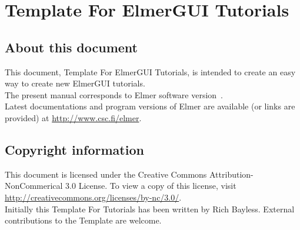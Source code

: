 \chapter*{Template For ElmerGUI Tutorials}

\section*{About this document}

This document, Template For ElmerGUI Tutorials, is intended to create an easy
way to create new ElmerGUI tutorials.\\


The present manual corresponds to Elmer software version~\elmerversion{}.\\

Latest documentations and program versions of Elmer are available (or links are provided) at 
\url{http://www.csc.fi/elmer}. 

\section*{Copyright information}

This document is licensed under the Creative Commons Attribution-NonCommerical 3.0 License. 
To view a copy of this license, visit \url{http://creativecommons.org/licenses/by-nc/3.0/}.\\

Initially this Template For Tutorials has been written by Rich Bayless.
External contributions to the Template are welcome.



